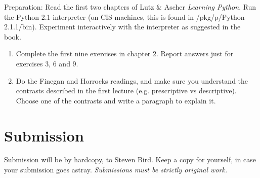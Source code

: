 \documentclass{cis530}
\begin{document}
\maketitle

Preparation: Read the first two chapters of
Lutz \& Ascher {\em Learning Python}.  Run the Python 2.1
interpreter (on CIS machines, this is found in
/pkg/p/Python-2.1.1/bin).  Experiment interactively with
the interpreter as suggested in the book.

\begin{enumerate}
\item
  Complete the first nine exercises in chapter 2.
  Report answers just for exercises 3, 6 and 9.

\item
  Do the Finegan and Horrocks readings, and make sure you
  understand the contrasts described in the first lecture
  (e.g. prescriptive vs descriptive).  Choose one of the
  contrasts and write a paragraph to explain it.

\end{enumerate}

\section*{Submission}

Submission will be by hardcopy, to Steven Bird.
Keep a copy for yourself, in case your submission goes
astray.  {\em Submissions must be strictly original work.}
\end{document}
